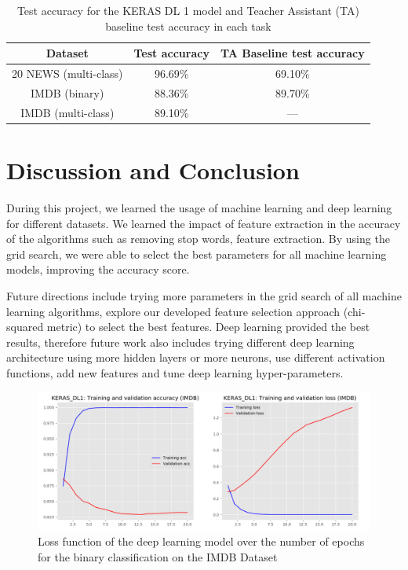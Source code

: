\documentclass[conference]{IEEEtran}
\begin{document}
\begin{table}[H]
  \caption{Test accuracy for the KERAS DL 1 model and Teacher Assistant (TA) baseline test accuracy in each task}
  \label{tab:best_results}
  \begin{center}
  \begin{tabular}{|c|c|c|}
    \hline
    Dataset & Test accuracy & TA Baseline test accuracy \\
    \hline
    20 NEWS (multi-class) & 96.69\% & 69.10\% \\
    \hline
    IMDB (binary)         & 88.36\% & 89.70\% \\
    \hline
    IMDB (multi-class)    & 89.10\% & ---     \\
    \hline
  \end{tabular}
  \end{center}
\end{table}

\section{Discussion and Conclusion}
\label{section:discussion}

During this project, we learned the usage of machine learning and deep learning for different datasets. We learned the impact of feature extraction in the accuracy of the algorithms such as removing stop words, feature extraction. By using the grid search, we were able to select the best parameters for all machine learning models, improving the accuracy score.

Future directions include trying more parameters in the grid search of all machine learning algorithms, explore our developed feature selection approach (chi-squared metric) to select the best features. Deep learning provided the best results, therefore future work also includes trying different deep learning architecture using more hidden layers or more neurons, use different activation functions, add new features and tune deep learning hyper-parameters.

\begin{figure}[H]
\centering
\includegraphics[scale = 0.22]{figs/deep_learning_using_keras/results_20newsgroups_and_imdb_using_binary_classification/20_epochs/KERAS_DL1_IMDB_REVIEWS_training_and_validation_accuracy_and_Loss.png}
\caption[Loss function of the deep learning model over the number of epochs for the binary classification on the IMDB Dataset]{Loss function of the deep learning model over the number of epochs for the binary classification on the IMDB Dataset}
\label{fig:dl_imdb_kerasbinary}
\end{figure}
\end{document}
